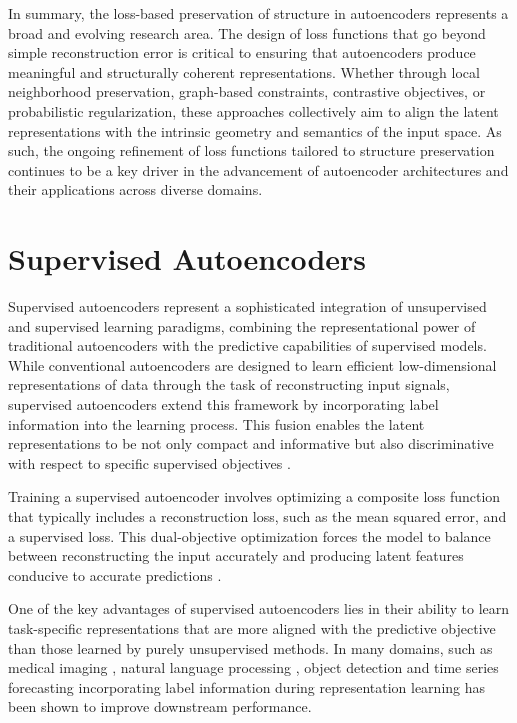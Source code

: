 In summary, the loss-based preservation of structure in autoencoders represents a broad and evolving research area. The design of loss functions that go beyond simple reconstruction error is critical to ensuring that autoencoders produce meaningful and structurally coherent representations. Whether through local neighborhood preservation, graph-based constraints, contrastive objectives, or probabilistic regularization, these approaches collectively aim to align the latent representations with the intrinsic geometry and semantics of the input space. As such, the ongoing refinement of loss functions tailored to structure preservation continues to be a key driver in the advancement of autoencoder architectures and their applications across diverse domains.

\section{Supervised Autoencoders}

Supervised autoencoders represent a sophisticated integration of unsupervised and supervised learning paradigms, combining the representational power of traditional autoencoders with the predictive capabilities of supervised models. While conventional autoencoders are designed to learn efficient low-dimensional representations of data through the task of reconstructing input signals, supervised autoencoders extend this framework by incorporating label information into the learning process. This fusion enables the latent representations to be not only compact and informative but also discriminative with respect to specific supervised objectives \cite{Le18}.

Training a supervised autoencoder involves optimizing a composite loss function that typically includes a reconstruction loss, such as the mean squared error, and a supervised loss. This dual-objective optimization forces the model to balance between reconstructing the input accurately and producing latent features conducive to accurate predictions \cite{Le18}.

One of the key advantages of supervised autoencoders lies in their ability to learn task-specific representations that are more aligned with the predictive objective than those learned by purely unsupervised methods. In many domains, such as medical imaging \cite{Rajpurkar17}, natural language processing \cite{Devlin18}, object detection \cite{Ren16} and time series forecasting \cite{Bieganowski24} incorporating label information during representation learning has been shown to improve downstream performance.

